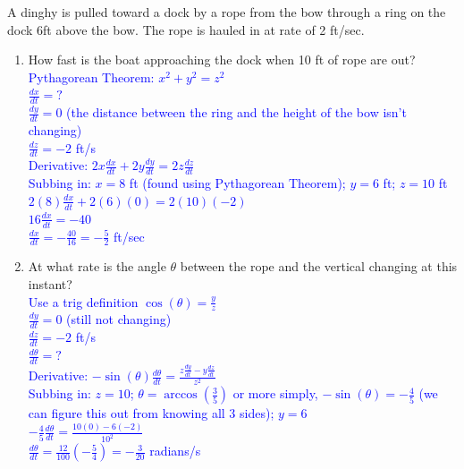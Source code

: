 \documentclass{ximera}
\begin{document}
\begin{exercise}  
    A dinghy is pulled toward a dock by a rope from the bow through a ring on the dock 6ft above the bow.  The rope is hauled in at rate of 2 ft/sec.  
    \begin{enumerate}
        \item How fast is the boat approaching the dock when 10 ft of rope are out?\\
        \textcolor{blue}{\color{blue}Pythagorean Theorem: $x^2+y^2=z^2$\\
        $\frac{dx}{dt}=?$\\
        $\frac{dy}{dt}=0$ (the distance between the ring and the height of the bow isn't changing)\\
        $\frac{dz}{dt}=-2$ ft/s\\
        Derivative: $2x\frac{dx}{dt}+2y\frac{dy}{dt}=2z\frac{dz}{dt}$\\
        Subbing in: $x=8$ ft (found using Pythagorean Theorem); $y=6$ ft; $z=10$ ft\\
        $2(8)\frac{dx}{dt}+2(6)(0)=2(10)(-2)$\\
        $16\frac{dx}{dt}=-40$\\
        $\frac{dx}{dt}=-\frac{40}{16}=-\frac{5}{2}$ ft/sec}

        \item At what rate is the angle $\theta$ between the rope and the vertical changing at this instant?\\
        \textcolor{blue}{\color{blue} Use a trig definition $\cos(\theta)=\frac{y}{z}$\\
        $\frac{dy}{dt}=0$ (still not changing)\\
        $\frac{dz}{dt}=-2$ ft/s\\
        $\frac{d\theta}{dt}=?$\\
        Derivative: $-\sin(\theta)\frac{d\theta}{dt}=\frac{z\frac{dy}{dt}-y\frac{dz}{dt}}{z^2}$\\
        Subbing in: $z=10$; $\theta=\arccos(\frac{3}{5})$ or more simply, $-\sin(\theta)=-\frac{4}{5}$ (we can figure this out from knowing all 3 sides); $y=6$\\
        $-\frac{4}{5}\frac{d\theta}{dt}=\frac{10(0)-6(-2)}{10^2}$\\
        $\frac{d\theta}{dt}=\frac{12}{100}(-\frac{5}{4})=-\frac{3}{20}$ radians/s} 
     \end{enumerate}
\end{exercise}   
\end{document}

